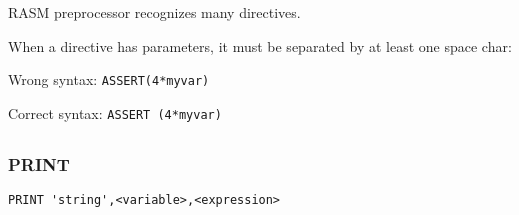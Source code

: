 
\section{}

\begin{xen}
RASM preprocessor recognizes many directives.

When a directive has parameters, it must be separated by at least one space char:

Wrong syntax: \texttt{ASSERT(4*myvar)}

Correct syntax: \texttt{ASSERT (4*myvar)}

\end{xen}

\subsection{}

\subsubsection{PRINT}

\begin{verbatim}
PRINT 'string',<variable>,<expression>
\end{verbatim}

